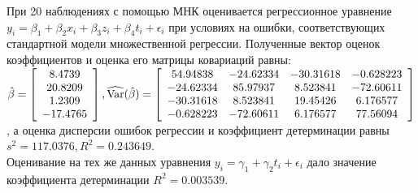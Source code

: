 \documentclass[addpoints, answers]{exam} %
\begin{document}
\begin{questions}
\begin{parts}
\end{parts}
\question При 20 наблюдениях с помощью МНК оценивается регрессионное уравнение $y_i=\beta_1+\beta_2 x_i+\beta_3 z_i+\beta_4 t_i+\epsilon_i$ при условиях на ошибки, соответствующих стандартной модели множественной регрессии. Полученные вектор оценок коэффициентов и оценка его матрицы ковариаций равны:\\
$\hat{\beta}=\left[ \begin{array}{c}
8.4739\\
20.8209\\
1.2309\\
-17.4765
\end{array}\right],
\widehat{\operatorname{Var}}(\hat{\beta})=\left[\begin{array}{cccc}
54.94838 & -24.62334 & -30.31618 & -0.628223\\
-24.62334 & 85.97937 & 8.523841 & -72.60611\\
-30.31618 & 8.523841 & 19.45426 & 6.176577\\
-0.628223 & -72.60611 & 6.176577 & 77.56094
\end{array}\right]$\\, а оценка дисперсии ошибок регрессии и коэффициент детерминации равны $s^2=117.0376, R^2=0.243649$.\\
Оценивание на тех же данных уравнения $y_i=\gamma_1+\gamma_2 t_i+\epsilon_i$ дало значение коэффициента детерминации $R^2=0.003539$.
\end{questions}
\end{document}
